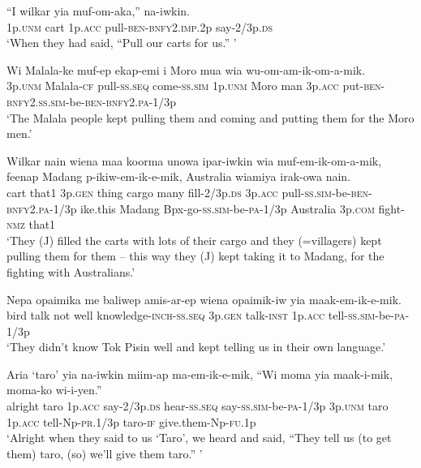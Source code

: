 \ea\label{ex:a:x38}
\gll  “I  wilkar  yia  muf-om-aka,”  na-iwkin. \\
1p.\textsc{unm}  cart  1p.\textsc{acc}  pull-\textsc{ben}-\textsc{bnfy}2.\textsc{imp}.2p  say-2/3p.\textsc{ds} \\
\glt ‘When they had said, “Pull our carts for us.” ’ \\
\z


\ea\label{ex:a:x39}
\gll  Wi  Malala-ke  muf-ep  ekap-emi  i  Moro mua  wia  wu-om-am-ik-om-a-mik.\\
3p.\textsc{unm}  Malala-\textsc{cf}  pull-\textsc{ss.seq}  come-\textsc{ss}.\textsc{sim}  1p.\textsc{unm}  Moro man  3p.\textsc{acc}  put-\textsc{ben}-\textsc{bnfy}2.\textsc{ss}.\textsc{sim}-be-\textsc{ben}-\textsc{bnfy}2.\textsc{pa}-1/3p \\ 
\glt ‘The Malala people kept pulling them and coming and putting them for the Moro men.’ \\
\z


\ea\label{ex:a:x40}
\gll  Wilkar  nain  wiena  maa  koorma  unowa  ipar-iwkin wia  muf-em-ik-om-a-mik, feenap  Madang  p-ikiw-em-ik-e-mik, Australia  wiamiya  irak-owa  nain. \\
cart  that1  3p.\textsc{gen}  thing  cargo  many  fill-2/3p.\textsc{ds} 3p.\textsc{acc}  pull-\textsc{ss}.\textsc{sim}-be-\textsc{ben}-\textsc{bnfy}2.\textsc{pa}-1/3p ike.this  Madang  Bpx-go-\textsc{ss}.\textsc{sim}-be-\textsc{pa}-1/3p Australia  3p.\textsc{com}  fight-\textsc{nmz}  that1\\ 
\glt ‘They (J) filled the carts with lots of their cargo and they (=villagers) kept pulling them for them  – this way they (J) kept taking it to Madang, for the fighting with Australians.’ \\
\z


\ea\label{ex:a:x41}
\gll  Nepa  opaimika  me  baliwep  amis-ar-ep wiena  opaimik-iw  yia  maak-em-ik-e-mik. \\
bird  talk  not  well  knowledge-\textsc{inch}-\textsc{ss.seq} 3p.\textsc{gen}  talk-\textsc{inst}  1p.\textsc{acc}  tell-\textsc{ss}.\textsc{sim}-be-\textsc{pa}-1/3p\\ 
\glt ‘They didn’t know Tok Pisin well and kept telling us in their own language.’ \\
\z


\ea\label{ex:a:x42}
\gll  Aria  ‘taro’  yia  na-iwkin  miim-ap ma-em-ik-e-mik,  “Wi  moma  yia  maak-i-mik,  moma-ko  wi-i-yen.” \\
alright  taro  1p.\textsc{acc}  say-2/3p.\textsc{ds}  hear-\textsc{ss.seq} say-\textsc{ss}.\textsc{sim}-be-\textsc{pa}-1/3p  3p.\textsc{unm}  taro  1p.\textsc{acc} tell-Np-\textsc{pr}.1/3p  taro-\textsc{if}  give.them-Np-\textsc{fu}.1p \\
\glt ‘Alright when they said to us ‘Taro’, we heard and said, “They tell us (to get them) taro, (so) we’ll give them taro.” ’ \\
\z


